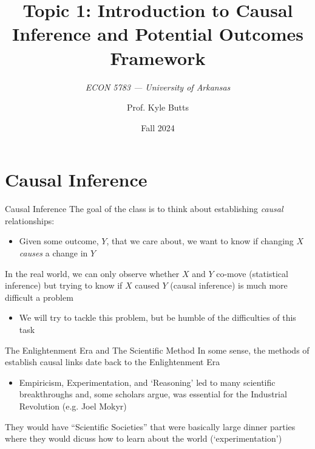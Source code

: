 \documentclass[aspectratio=169,t,11pt,table]{beamer}
\title{Topic 1: Introduction to Causal Inference and Potential Outcomes Framework}
\subtitle{\it  ECON 5783 — University of Arkansas}
\date{Fall 2024}
\author{Prof. Kyle Butts}
\begin{document}
\begin{frame}
  \maketitle

\end{frame}

\section{Causal Inference}

\begin{frame}{Causal Inference}
  The goal of the class is to think about establishing \emph{causal} relationships:
  \begin{itemize}
    \item Given some outcome, $Y$, that we care about, we want to know if changing $X$ \emph{causes} a change in $Y$
  \end{itemize}
    
  \pause
  \bigskip
  In the real world, we can only observe whether $X$ and $Y$ co-move (\alert{statistical inference}) but trying to know if $X$ caused $Y$ (\alert{causal inference}) is much more difficult a problem
  \begin{itemize}
    \item We will try to tackle this problem, but be humble of the difficulties of this task
  \end{itemize}
\end{frame}

\begin{frame}{The Enlightenment Era and The Scientific Method}
  In some sense, the methods of establish causal links date back to the Enlightenment Era
  \begin{itemize}
    \item Empiricism, Experimentation, and `Reasoning' led to many scientific breakthroughs and, some scholars argue, was essential for the Industrial Revolution (e.g. Joel Mokyr)
  \end{itemize}

  \pause
  \bigskip
  They would have ``Scientific Societies'' that were basically large dinner parties where they would dicuss how to learn about the world (`experimentation') 
\end{frame}
\end{document}
